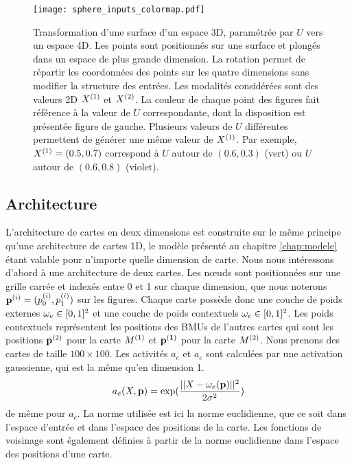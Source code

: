 \documentclass[../main]{subfiles}
\begin{document}
\begin{figure}
	\texttt{[image: sphere\_inputs\_colormap.pdf]}
	\caption{Transformation d'une surface d'un espace 3D, paramétrée par $U$ vers un espace 4D. Les points sont positionnés sur une surface et plongés dans un espace de plus grande dimension. La rotation permet de répartir les coordonnées des points sur les quatre dimensions sans modifier la structure des entrées. Les modalités considérées sont des valeurs 2D $X^{({1})}$ et $X^{({2})}$.
	La couleur de chaque point des figures fait référence à la valeur de $U$ correspondante, dont la disposition est présentée figure de gauche. Plusieurs valeurs de $U$ différentes permettent de générer une même valeur de $X^{({1})}$. Par exemple, $X^{({1})} = (0.5, 0.7)$ correspond à $U$ autour de $(0.6,0.3)$ (vert) ou $U$ autour de $ (0.6,0.8)$ (violet).
	\label{fig:sphere_inputs}}
\end{figure}

\subsection{Architecture}

L'architecture de cartes en deux dimensions est construite sur le même principe qu'une architecture de cartes 1D, le modèle présenté au chapitre \ref{chap:modele} étant valable pour n'importe quelle dimension de carte.
Nous nous intéressons d'abord à une architecture de deux cartes. Les n\oe{}uds sont positionnées sur une grille carrée et indexés entre 0 et 1 sur chaque dimension, que nous noterons $\mathbf{p}^{({i})} = (p^{({i})}_0, p^{({i})}_1)$ sur les figures. 
Chaque carte possède donc une couche de poids externes $\omega_{e} \in [0,1]^2$ et une couche de poids contextuels $\omega_c \in [0,1]^2$.
Les poids contextuels représentent les positions des BMUs de l'autres cartes qui sont les positions $\mathbf{p}^{({2})}$ pour la carte $M^{({1})}$ et $\mathbf{p^{({1})}}$ pour la carte $M^{({2})}$. Nous prenons des cartes de taille $100 \times 100$.
Les activités $a_e$ et $a_c$ sont calculées par une activation gaussienne, qui est la même qu'en dimension 1.
$$a_e(X,\mathbf{p}) = \exp(\frac{||X - \omega_e(\mathbf{p}) ||^2}{2\sigma^2})$$
de même pour $a_c$.
La norme utilisée est ici la norme euclidienne, que ce soit dans l'espace d'entrée et dans l'espace des positions de la carte.
Les fonctions de voisinage sont également définies à partir de la norme euclidienne dans l'espace des positions d'une carte.
\end{document}
